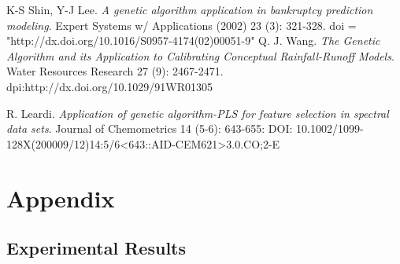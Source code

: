 \documentclass[onecolumn]{article}
\begin{document}
\begin{multicols}{2}
\begin{thebibliography}{9}
		K-S Shin, Y-J Lee. \emph{A genetic algorithm application in bankruptcy prediction modeling}. Expert Systems w/ Applications (2002) 23 (3): 321-328. doi = "http://dx.doi.org/10.1016/S0957-4174(02)00051-9"
		Q. J. Wang. \emph{The Genetic Algorithm and its Application to Calibrating Conceptual Rainfall-Runoff Models}. Water Resources Research 27 (9): 2467-2471. dpi:http://dx.doi.org/10.1029/91WR01305

R. Leardi. \emph{Application of genetic algorithm-PLS for feature selection in spectral data sets}. Journal of Chemometrics 14 (5-6): 643-655: DOI: 10.1002/1099-128X(200009/12)14:5/6<643::AID-CEM621>3.0.CO;2-E

\end{thebibliography}
\end{multicols}

\section{Appendix}
\subsection{Experimental Results}

\end{document}
